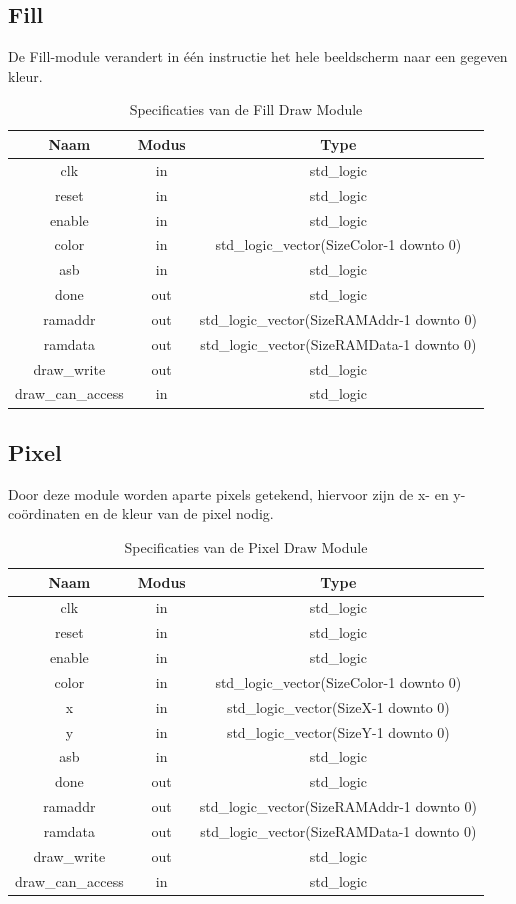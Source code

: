 \documentclass{scrartcl} %
\begin{document}
\subsection {Fill}
De Fill-module verandert in één instructie het hele beeldscherm naar een gegeven kleur.

\begin{table}[H]
\centering
\caption{Specificaties van de Fill Draw Module}
\label{tab:spec-fill-draw}
\begin{tabular}{c c c}
	\hline\hline
 	Naam & Modus & Type\\
 	\hline	
	clk & in & std\_logic \\
	reset & in & std\_logic \\
	enable& in & std\_logic \\
	color & in & std\_logic\_vector(SizeColor-1 downto 0) \\
	asb & in & std\_logic \\
	done & out & std\_logic \\
	ramaddr &out & std\_logic\_vector(SizeRAMAddr-1 downto 0) \\
	ramdata &out & std\_logic\_vector(SizeRAMData-1 downto 0) \\
	draw\_write &out & std\_logic \\
	draw\_can\_access & in & std\_logic \\
  	\hline
\end{tabular}
\end{table}

\subsection {Pixel}
Door deze module worden aparte pixels getekend, hiervoor zijn de x- en y-coördinaten en de kleur van de pixel nodig.

\begin{table}[H]
\centering
\caption{Specificaties van de Pixel Draw Module}
\label{tab:spec-pixel-draw}
\begin{tabular}{c c c}
	\hline\hline
 	Naam & Modus & Type\\
 	\hline	
	clk & in & std\_logic \\
	reset & in & std\_logic \\
	enable& in & std\_logic \\
	color & in & std\_logic\_vector(SizeColor-1 downto 0) \\
	x & in & std\_logic\_vector(SizeX-1 downto 0) \\
	y & in & std\_logic\_vector(SizeY-1 downto 0) \\
	asb & in & std\_logic \\
	done & out & std\_logic \\
	ramaddr &out & std\_logic\_vector(SizeRAMAddr-1 downto 0) \\
	ramdata &out & std\_logic\_vector(SizeRAMData-1 downto 0) \\
	draw\_write &out & std\_logic \\
	draw\_can\_access & in & std\_logic \\
  	\hline
\end{tabular}
\end{table}
\end{document}
